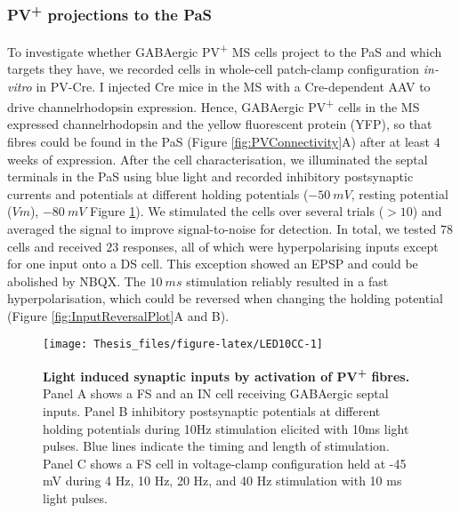 \documentclass[
  12pt,
  a4paper,
  openany]{book}
\begin{document}
\hypertarget{PVConnectivity}{%
\subsubsection{\texorpdfstring{PV\textsuperscript{+} projections to the PaS}{PV+ projections to the PaS}}\label{PVConnectivity}}

To investigate whether GABAergic PV\textsuperscript{+} MS cells project to the PaS and which targets they have, we recorded cells in whole-cell patch-clamp configuration \emph{in-vitro} in PV-Cre. I injected Cre mice in the MS with a Cre-dependent AAV to drive channelrhodopsin expression. Hence, GABAergic PV\textsuperscript{+} cells in the MS expressed channelrhodopsin and the yellow fluorescent protein (YFP), so that fibres could be found in the PaS (Figure \ref{fig:PVConnectivity}A) after at least \(4\) weeks of expression. After the cell characterisation, we illuminated the septal terminals in the PaS using blue light and recorded inhibitory postsynaptic currents and potentials at different holding potentials (\(-50\ mV\), resting potential (\(Vm\)), \(-80\ mV\) Figure \ref{fig:LED10CC}). We stimulated the cells over several trials (\(>10\)) and averaged the signal to improve signal-to-noise for detection. In total, we tested \(78\) cells and received \(23\) responses, all of which were hyperpolarising inputs except for one input onto a DS cell. This exception showed an EPSP and could be abolished by NBQX. The \(10\ ms\) stimulation reliably resulted in a fast hyperpolarisation, which could be reversed when changing the holding potential (Figure \ref{fig:InputReversalPlot}A and B).




\begin{figure}[htbp]

{\centering \texttt{[image: Thesis\_files/figure-latex/LED10CC-1]} 

}

\caption[Light induced synaptic inputs by activation of PV\textsuperscript{+} fibres]{\textbf{Light induced synaptic inputs by activation of PV\textsuperscript{+} fibres.} Panel A shows a FS and an IN cell receiving GABAergic septal inputs. Panel B inhibitory postsynaptic potentials at different holding potentials during 10Hz stimulation elicited with 10ms light pulses. Blue lines indicate the timing and length of stimulation. Panel C shows a FS cell in voltage-clamp configuration held at -45 mV during 4 Hz, 10 Hz, 20 Hz, and 40 Hz stimulation with 10 ms light pulses.}\label{fig:LED10CC}
\end{figure}
\end{document}
